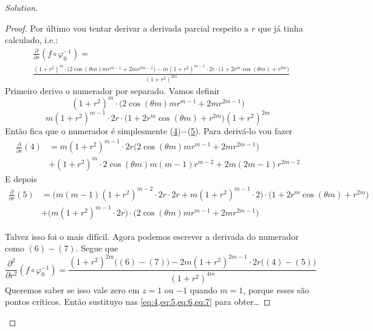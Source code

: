 \begin{proof}[Solution]
\begin{proof}
Por último vou tentar derivar a derivada parcial respeito a \(r\) que já tinha calculado, i.e.:
\begin{equation}\label{eq:3}\begin{aligned}&\frac{\partial }{\partial r}(f \circ \varphi_0^{-1})=\\&\frac{(1+r^2)^m\cdot \Big(2\cos (\theta m)m r^{m-1}+2mr^{2m-1}\Big)-m(1+r^2)^{m-1}\cdot 2r\cdot \Big(1+2r^m \cos (\theta m)+r^{2m}\Big)}{(1+r^2)^{2m}}
\end{aligned}\end{equation}
Primeiro derivo o numerador por separado. Vamos definir
\begin{equation}\label{eq:4}
(1+r^2)^m\cdot \Big(2\cos (\theta m)m r^{m-1}+2mr^{2m-1}\Big)
\end{equation}
\begin{equation}\label{eq:5}
m(1+r^2)^{m-1}\cdot 2r\cdot \Big(1+2r^m \cos (\theta m)+r^{2m}\Big)(1+r^2)^{2m} 
\end{equation}
Então fica que o numerador é simplesmente (\hyperref[eq:4]{4})\(-\)(\hyperref[eq:5]{5}). Para derivá-lo vou fazer
\begin{equation}\label{eq:6}\begin{aligned}\frac{\partial }{\partial r}(\hyperref[eq:4]{4})&=m(1+r^2)^{m-1}\cdot 2r\Big(2\cos (\theta m)m r^{m-1}+2mr^{2m-1}\Big)\\
	& +(1+r^2)^m\cdot 2\cos(\theta m)m(m-1)r^{m-2}+2m(2m-1)r^{2m-2}
\end{aligned}\end{equation}
E depois
\begin{equation}\label{eq:7}
\begin{aligned}
\frac{\partial }{\partial r}(\hyperref[eq:5]{5})
&=\Big(m(m-1)(1+r^2)^{m-2}\cdot 2r\cdot 2r+m(1+r^2)^{m-1}\cdot 2 \Big)\cdot \Big(1+2r^m \cos (\theta m)+r^{2m}\Big)\\
&+\Big(m(1+r^2)^{m-1}\cdot 2r \Big)\cdot \Big(2\cos(\theta m)mr^{m-1}+2mr^{2m-1}\Big)
\end{aligned}\end{equation}

Talvez isso foi o mais difícil. Agora podemos escrever a derivada do numerador como \((\hyperref[eq:6]{6})-(\hyperref[eq:7]{7})\). Segue que
\begin{equation}\label{eq:8}
\frac{\partial^2 }{\partial r^2}(f \circ \varphi_0^{-1})=\frac{(1+r^2)^{2m}\Big((\hyperref[eq:6]{6})-(\hyperref[eq:7]{7})\Big)-2m(1+r^2)^{2m-1}\cdot 2r\Big((\hyperref[eq:4]{4})-(\hyperref[eq:5]{5})\Big)}{(1+r^2)^{4m}}
\end{equation}
Queremos saber se isso vale zero em \(z=1\) ou \(-1\) quando  \(m=1\), porque esses são pontos críticos. Então sustituyo nas  \cref{eq:4,eq:5,eq:6,eq:7} para obter{\color{2}…}
\end{proof}


\end{proof}
